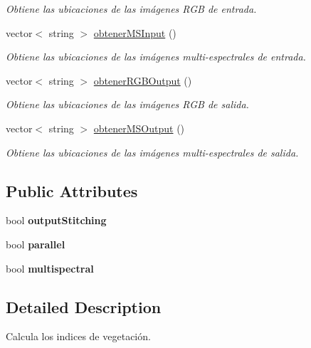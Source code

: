 \begin{DoxyCompactItemize}
\begin{DoxyCompactList}\small\item\em Obtiene las ubicaciones de las imágenes R\+GB de entrada. \end{DoxyCompactList}\item 
vector$<$ string $>$ \mbox{\hyperlink{classIndexCalculation_a889a95c13bc480c1194016ca0e1e9559}{obtener\+M\+S\+Input}} ()
\begin{DoxyCompactList}\small\item\em Obtiene las ubicaciones de las imágenes multi-\/espectrales de entrada. \end{DoxyCompactList}\item 
vector$<$ string $>$ \mbox{\hyperlink{classIndexCalculation_a23a9f9a23db086109989fb93450a70d7}{obtener\+R\+G\+B\+Output}} ()
\begin{DoxyCompactList}\small\item\em Obtiene las ubicaciones de las imágenes R\+GB de salida. \end{DoxyCompactList}\item 
vector$<$ string $>$ \mbox{\hyperlink{classIndexCalculation_a43b986cd58175d47714a399e7fdfd7e3}{obtener\+M\+S\+Output}} ()
\begin{DoxyCompactList}\small\item\em Obtiene las ubicaciones de las imágenes multi-\/espectrales de salida. \end{DoxyCompactList}\end{DoxyCompactItemize}
\subsection*{Public Attributes}
\begin{DoxyCompactItemize}
\item 
\mbox{\label{classIndexCalculation_a2a1ce2e6437e6bd929cf6f975876e4ca}} 
bool {\bfseries output\+Stitching}
\item 
\mbox{\label{classIndexCalculation_a6b0355c3158fd94f6e0d9fa6d06f4634}} 
bool {\bfseries parallel}
\item 
\mbox{\label{classIndexCalculation_ab8b7a39b981cacd16e8bbbe1e680cc7a}} 
bool {\bfseries multispectral}
\end{DoxyCompactItemize}


\subsection{Detailed Description}
Calcula los indices de vegetación. 

